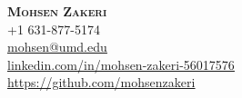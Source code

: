 \documentclass[A4,11pt]{article}
\begin{document}
\begin{comment}
In Europe it is common to include a picture of ones self in the CV. Select
which heading appropriate for the document you are creating.

\begin{minipage}[c]{0.05\textwidth}
\-\
\end{minipage}
\begin{minipage}[c]{0.2\textwidth}
\begin{tikzpicture}
\end{tikzpicture}
\end{minipage}

\end{comment}

\begin{minipage}[c]{0.4\textwidth}
    \textbf{\Huge \scshape{Mohsen Zakeri}} \\ \vspace{1pt} 
    \small{+1 631-877-5174} \\
    \href{mailto:mohsen@umd.edu}{\underline{mohsen@umd.edu}}\\
    \href{https://www.linkedin.com/in/mohsen-zakeri-56017576/}{\underline{linkedin.com/in/mohsen-zakeri-56017576}} \\
    \href{https://github.com/mohsenzakeri}{\underline{https://github.com/mohsenzakeri}}
\end{minipage}

\end{document}
